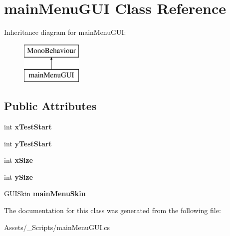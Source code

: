 \hypertarget{classmain_menu_g_u_i}{}\section{main\+Menu\+G\+U\+I Class Reference}
\label{classmain_menu_g_u_i}
Inheritance diagram for main\+Menu\+G\+U\+I\+:\begin{figure}[H]
\begin{center}
\leavevmode
\includegraphics[height=2.000000cm]{classmain_menu_g_u_i}
\end{center}
\end{figure}
\subsection*{Public Attributes}
\begin{DoxyCompactItemize}
\item 
\hypertarget{classmain_menu_g_u_i_a42b7f36725e4c2015762aaeecf74533c}{}int {\bfseries x\+Test\+Start}\label{classmain_menu_g_u_i_a42b7f36725e4c2015762aaeecf74533c}

\item 
\hypertarget{classmain_menu_g_u_i_a8bfbb7df6b339e52a58d5f0a7642a1f4}{}int {\bfseries y\+Test\+Start}\label{classmain_menu_g_u_i_a8bfbb7df6b339e52a58d5f0a7642a1f4}

\item 
\hypertarget{classmain_menu_g_u_i_ae82ac76098da8b7ac1317b34291b684b}{}int {\bfseries x\+Size}\label{classmain_menu_g_u_i_ae82ac76098da8b7ac1317b34291b684b}

\item 
\hypertarget{classmain_menu_g_u_i_a2737cfa9819ee99c8529bb38484944b9}{}int {\bfseries y\+Size}\label{classmain_menu_g_u_i_a2737cfa9819ee99c8529bb38484944b9}

\item 
\hypertarget{classmain_menu_g_u_i_a6ddec24764eff88e9f7db5fdd1e6446f}{}G\+U\+I\+Skin {\bfseries main\+Menu\+Skin}\label{classmain_menu_g_u_i_a6ddec24764eff88e9f7db5fdd1e6446f}

\end{DoxyCompactItemize}


The documentation for this class was generated from the following file\+:\begin{DoxyCompactItemize}
\item 
Assets/\+\_\+\+Scripts/main\+Menu\+G\+U\+I.\+cs\end{DoxyCompactItemize}
